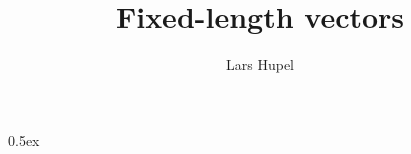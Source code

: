 \documentclass[11pt,a4paper]{article}
\begin{document}
\title{Fixed-length vectors}
\author{Lars Hupel}
\maketitle

\tableofcontents

\parindent 0pt\parskip 0.5ex


\end{document}
